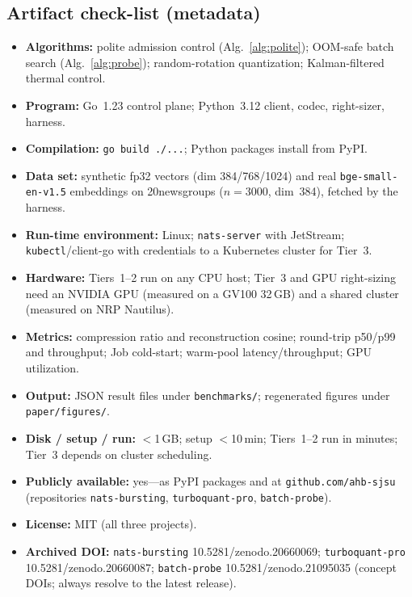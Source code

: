 \documentclass[conference]{IEEEtran}
\begin{document}
\subsection{Artifact check-list (metadata)}
\begin{itemize}\itemsep1pt
\item \textbf{Algorithms:} polite admission control (Alg.~\ref{alg:polite}); OOM-safe batch
search (Alg.~\ref{alg:probe}); random-rotation quantization; Kalman-filtered thermal control.
\item \textbf{Program:} Go~1.23 control plane; Python~3.12 client, codec, right-sizer, harness.
\item \textbf{Compilation:} \texttt{go build ./...}; Python packages install from PyPI.
\item \textbf{Data set:} synthetic fp32 vectors (dim 384/768/1024) and real
\texttt{bge-small-en-v1.5} embeddings on 20newsgroups ($n{=}3000$, dim~384), fetched by the harness.
\item \textbf{Run-time environment:} Linux; \texttt{nats-server} with JetStream;
\texttt{kubectl}/client-go with credentials to a Kubernetes cluster for Tier~3.
\item \textbf{Hardware:} Tiers~1--2 run on any CPU host; Tier~3 and GPU right-sizing need an
NVIDIA GPU (measured on a GV100 32\,GB) and a shared cluster (measured on NRP Nautilus).
\item \textbf{Metrics:} compression ratio and reconstruction cosine; round-trip p50/p99 and
throughput; Job cold-start; warm-pool latency/throughput; GPU utilization.
\item \textbf{Output:} JSON result files under \texttt{benchmarks/}; regenerated figures under
\texttt{paper/figures/}.
\item \textbf{Disk / setup / run:} $<$1\,GB; setup $<$10\,min; Tiers~1--2 run in minutes; Tier~3
depends on cluster scheduling.
\item \textbf{Publicly available:} yes---as PyPI packages and at
\texttt{github.com/ahb-sjsu} (repositories \texttt{nats-bursting}, \texttt{turboquant-pro},
\texttt{batch-probe}).
\item \textbf{License:} MIT (all three projects).
\item \textbf{Archived DOI:} \texttt{nats-bursting} 10.5281/zenodo.20660069;
\texttt{turboquant-pro} 10.5281/zenodo.20660087; \texttt{batch-probe} 10.5281/zenodo.21095035
(concept DOIs; always resolve to the latest release).
\end{itemize}
\end{document}
